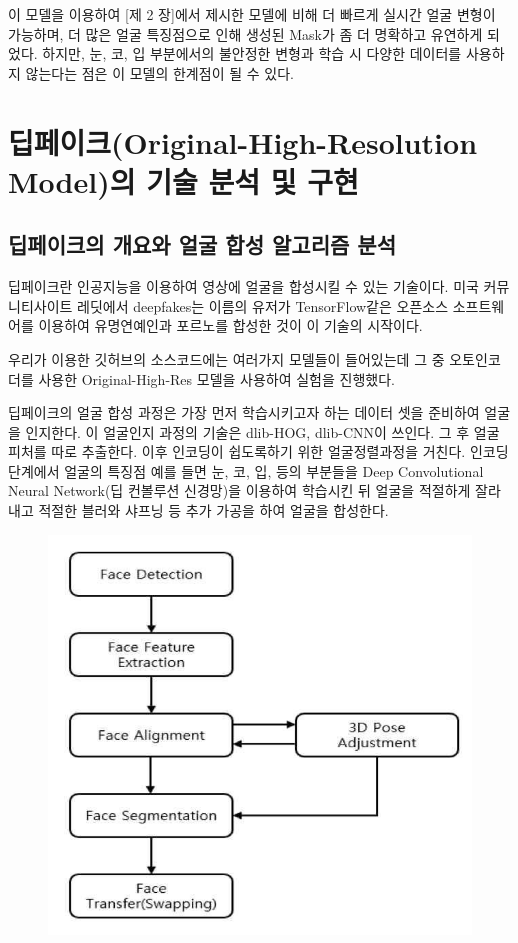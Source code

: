 \documentclass[chapter,oneside]{oblivoir}
\begin{document}
이 모델을 이용하여 [제 2 장]에서 제시한 모델에 비해 더 빠르게 실시간 얼굴 변형이 가능하며, 더 많은 얼굴 특징점으로 인해 생성된 Mask가 좀 더 명확하고 유연하게 되었다. 하지만, 눈, 코, 입 부분에서의 불안정한 변형과 학습 시 다양한 데이터를 사용하지 않는다는 점은 이 모델의 한계점이 될 수 있다.

\chapter{딥페이크(Original-High-Resolution Model)의 기술 분석 및 구현}

\section{ 딥페이크의 개요와 얼굴 합성 알고리즘 분석}

딥페이크란 인공지능을 이용하여 영상에 얼굴을 합성시킬 수 있는 기술이다. 미국 커뮤니티사이트 레딧에서 deepfakes는 이름의 유저가 TensorFlow같은 오픈소스 소프트웨어를 이용하여 유명연예인과 포르노를 합성한 것이 이 기술의 시작이다.

우리가 이용한 \cite{reference11} 깃허브의 소스코드에는 여러가지 모델들이 들어있는데 그 중 오토인코더를 사용한 Original-High-Res 모델을 사용하여 실험을 진행했다.

딥페이크의 얼굴 합성 과정은 가장 먼저 학습시키고자 하는 데이터 셋을 준비하여 얼굴을 인지한다. 이 얼굴인지 과정의 기술은 dlib-HOG, dlib-CNN이 쓰인다. 그 후 얼굴 피처를 따로 추출한다. 이후 인코딩이 쉽도록하기 위한 얼굴정렬과정을 거친다. 인코딩 단계에서 얼굴의 특징점 예를 들면 눈, 코, 입, 등의 부분들을 Deep Convolutional Neural Network(딥 컨볼루션 신경망)을 이용하여 학습시킨 뒤 얼굴을 적절하게 잘라내고 적절한 블러와 샤프닝 등 추가 가공을 하여 얼굴을 합성한다.


\begin{figure}[h!]
\centering
\includegraphics{pic/chp4/img798}
\end{figure}
\end{document}
